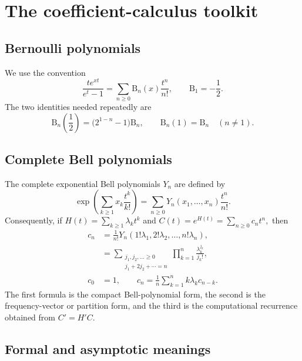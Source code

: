 \documentclass[11pt,a4paper]{article}
\theoremstyle{clean}
\theoremstyle{definition}
\newcommand{\B}{\mathrm B}
\begin{document}
\section{The coefficient-calculus toolkit}
\label{sec:toolkit}

\subsection{Bernoulli polynomials}

We use the convention
\begin{equation}
 \frac{te^{xt}}{e^t-1}=\sum_{n\ge0}\B_n(x)\frac{t^n}{n!},
 \qquad \B_1=-\frac12.
 \label{eq:Bernoulli-egf}
\end{equation}
The two identities needed repeatedly are
\begin{equation}
 \B_n\!\left(\frac12\right)=\bigl(2^{1-n}-1\bigr)\B_n,
 \qquad
 \B_n(1)=\B_n\quad(n\ne1).
 \label{eq:Bernoulli-half}
\end{equation}

\subsection{Complete Bell polynomials}

The complete exponential Bell polynomials \(Y_n\) are defined by
\begin{equation}
 \exp\!\left(\sum_{k\ge1}x_k\frac{t^k}{k!}\right)
 =\sum_{n\ge0}Y_n(x_1,\ldots,x_n)\frac{t^n}{n!}.
 \label{eq:Bell-def}
\end{equation}
Consequently, if
\(
 H(t)=\sum_{k\ge1}\lambda_kt^k
\)
and
\(
 C(t)=e^{H(t)}=\sum_{n\ge0}c_nt^n,
\)
then
\begin{align}
 c_n&=\frac1{n!}Y_n(1!\lambda_1,2!\lambda_2,\ldots,n!\lambda_n),
 \label{eq:Bell-c}\\
 &=\sum_{\substack{j_1,j_2,\ldots\ge0\\
                    j_1+2j_2+\cdots=n}}
   \prod_{k=1}^n\frac{\lambda_k^{j_k}}{j_k!},
 \label{eq:partition-c}\\
 c_0&=1,\qquad
 c_n=\frac1n\sum_{k=1}^n k\lambda_kc_{n-k}.
 \label{eq:recurrence-c}
\end{align}
The first formula is the compact Bell-polynomial form, the second is the frequency-vector or partition form, and the third is the computational recurrence obtained from \(C'=H'C\).

\subsection{Formal and asymptotic meanings}
\end{document}
